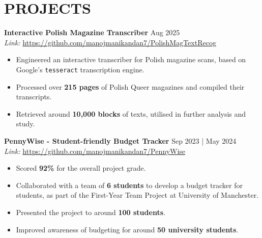 \documentclass[a4paper,1.5pt]{extarticle}
\begin{document}

\section*{PROJECTS}
\noindent
\textbf{Interactive Polish Magazine Transcriber} \hfill Aug 2025 \\ %
\textit{Link:} \url{https://github.com/manojmanikandan7/PolishMagTextRecog}  %
\begin{itemize}
    \item Engineered an interactive transcriber for Polish magazine scans, based on Google's \texttt{tesseract} transcription engine.
    \item Processed over \textbf{215 pages} of Polish Queer magazines and compiled their transcripts.
    \item Retrieved around \textbf{10,000 blocks} of texts, utilised in further analysis and study.
\end{itemize}

\noindent
\textbf{PennyWise - Student-friendly Budget Tracker} \hfill Sep 2023 | May 2024 \\ %
\textit{Link:} \url{https://github.com/manojmanikandan7/PennyWise}
\begin{itemize}
    \item Scored \textbf{92\%} for the overall project grade.
    \item Collaborated with a team of \textbf{6 students} to develop a budget tracker for students, as part of the First-Year Team Project at University of Manchester.
    \item Presented the project to around \textbf{100 students}.
    \item Improved awareness of budgeting for around \textbf{50 university students}.
\end{itemize}
\end{document}
